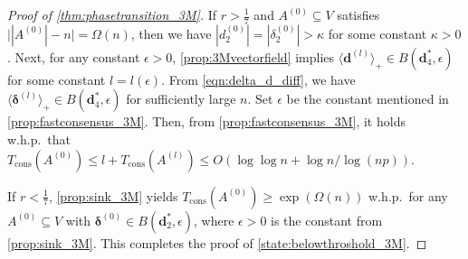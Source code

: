 \documentclass[letterpaper,11pt]{article}
\newcommand{\Tcons}{T_{\mathrm{cons}}}
\newcommand*{\absp}[1]{\langle #1 \rangle_+}
\begin{document}
\begin{proof}[Proof of \cref{thm:phasetransition_3M}]
If $r>\frac{1}{7}$ and $A^{(0)}\subseteq V$ satisfies $\bigl| |A^{(0)}|-n \bigr| = \Omega(n)$, then we have $|d^{(0)}_2|=|\delta^{(0)}_2|>\kappa$ for some constant $\kappa>0$.
Next, for any constant $\epsilon>0$, \cref{prop:3Mvectorfield} implies $\absp{\mathbf{d}^{(l)}} \in B(\mathbf{d}^*_4,\epsilon)$ for some constant $l=l(\epsilon)$.
From \cref{eqn:delta_d_diff}, we have $\absp{{\boldsymbol \delta}^{(l)}}\in B(\mathbf{d}^*_4,\epsilon)$ for sufficiently large $n$. 
Set $\epsilon$ be the constant mentioned in \cref{prop:fastconsensus_3M}. 
Then, from \cref{prop:fastconsensus_3M}, it holds w.h.p.~that $\Tcons(A^{(0)}) \leq l+\Tcons(A^{(l)}) \leq O(\log\log n+\log n/\log (np))$.

If $r<\frac{1}{7}$, \cref{prop:sink_3M} yields $\Tcons(A^{(0)}) \geq \exp(\Omega(n))$ w.h.p.~for any $A^{(0)}\subseteq V$ with ${\boldsymbol \delta}^{(0)} \in B(\mathbf{d}^*_2,\epsilon)$, where $\epsilon>0$ is the constant from \cref{prop:sink_3M}.
This completes the proof of \ref{state:belowthroshold_3M}.
\end{proof}
\end{document}
